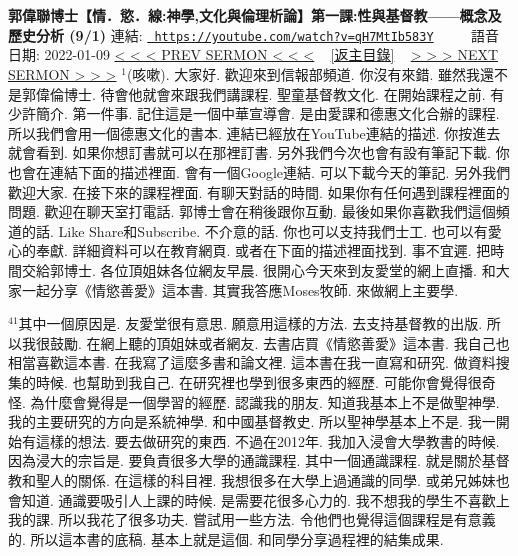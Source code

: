 \documentclass{book}
\begin{document}
\section{}
\label{sec:qH7MtIb583Y}
\textbf{郭偉聯博士【情．慾．線:神學,文化與倫理析論】第一課:性與基督教——概念及歷史分析 (9/1)}
\newline
\newline
連結: \href{https://youtube.com/watch?v=qH7MtIb583Y}{\texttt{ https://youtube.com/watch?v=qH7MtIb583Y}} ~~~~ 語音日期: 2022-01-09 
\newline
\newline
\hyperref[sec:PD1mkT7LGh4]{\small{< < < PREV SERMON < < <}}
~
\hyperref[sec:index]{\small{[返主目錄]}}
~
\hyperref[sec:wqj8hNAtWGc]{\small{> > > NEXT SERMON > > >}}
\newline
\newline
$^{1}$(咳嗽).
大家好.
歡迎來到信報部頻道.
你沒有來錯.
雖然我還不是郭偉倫博士.
待會他就會來跟我們講課程.
聖童基督教文化.
在開始課程之前.
有少許簡介.
第一件事.
記住這是一個中華宣導會.
是由愛課和德惠文化合辦的課程.
所以我們會用一個德惠文化的書本.
連結已經放在YouTube連結的描述.
你按進去就會看到.
如果你想訂書就可以在那裡訂書.
另外我們今次也會有設有筆記下載.
你也會在連結下面的描述裡面.
會有一個Google連結.
可以下載今天的筆記.
另外我們歡迎大家.
在接下來的課程裡面.
有聊天對話的時間.
如果你有任何遇到課程裡面的問題.
歡迎在聊天室打電話.
郭博士會在稍後跟你互動.
最後如果你喜歡我們這個頻道的話.
Like Share和Subscribe.
不介意的話.
你也可以支持我們士工.
也可以有愛心的奉獻.
詳細資料可以在教育網頁.
或者在下面的描述裡面找到.
事不宜遲.
把時間交給郭博士.
各位頂姐妹各位網友早晨.
很開心今天來到友愛堂的網上直播.
和大家一起分享《情慾善愛》這本書.
其實我答應Moses牧師.
來做網上主要學.

$^{41}$其中一個原因是.
友愛堂很有意思.
願意用這樣的方法.
去支持基督教的出版.
所以我很鼓勵.
在網上聽的頂姐妹或者網友.
去書店買《情慾善愛》這本書.
我自己也相當喜歡這本書.
在我寫了這麼多書和論文裡.
這本書在我一直寫和研究.
做資料搜集的時候.
也幫助到我自己.
在研究裡也學到很多東西的經歷.
可能你會覺得很奇怪.
為什麼會覺得是一個學習的經歷.
認識我的朋友.
知道我基本上不是做聖神學.
我的主要研究的方向是系統神學.
和中國基督教史.
所以聖神學基本上不是.
我一開始有這樣的想法.
要去做研究的東西.
不過在2012年.
我加入浸會大學教書的時候.
因為浸大的宗旨是.
要負責很多大學的通識課程.
其中一個通識課程.
就是關於基督教和聖人的關係.
在這樣的科目裡.
我想很多在大學上過通識的同學.
或弟兄姊妹也會知道.
通識要吸引人上課的時候.
是需要花很多心力的.
我不想我的學生不喜歡上我的課.
所以我花了很多功夫.
嘗試用一些方法.
令他們也覺得這個課程是有意義的.
所以這本書的底稿.
基本上就是這個.
和同學分享過程裡的結集成果.
\end{document}
